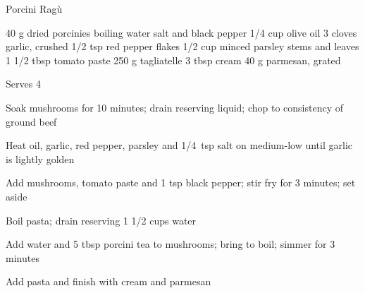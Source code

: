 \begin{denserecipe}{Porcini Ragù}{\vegetarian{}}
\begin{ingredients}
40 g dried porcinies
boiling water
salt and black pepper
1/4 cup olive oil
3 cloves garlic, crushed
1/2 tsp red pepper flakes
1/2 cup minced parsley stems and leaves
1 1/2 tbsp tomato paste
250 g tagliatelle
3 tbsp cream
40 g parmesan, grated
\end{ingredients}
\nextcolumn
Serves 4
\begin{steps}
    \item Soak mushrooms for 10 minutes; drain reserving liquid; chop to consistency of ground beef
    \item Heat oil, garlic, red pepper, parsley and 1/4~tsp salt on medium-low until garlic is lightly golden
    \item Add mushrooms, tomato paste and 1 tsp black pepper; stir fry for 3 minutes; set aside
    \item Boil pasta; drain reserving 1 1/2 cups water
    \item Add water and 5 tbsp porcini tea to mushrooms; bring to boil; simmer for 3 minutes
    \item Add pasta and finish with cream and parmesan
\end{steps}
\end{denserecipe}
